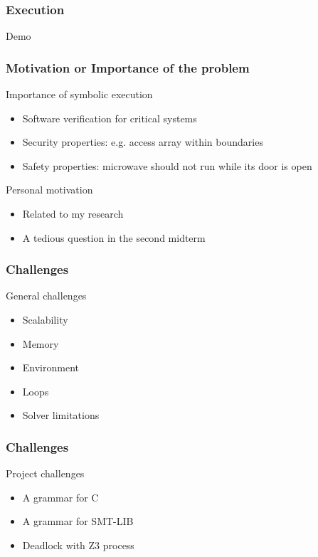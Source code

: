 \documentclass{beamer}
\begin{document}
\begin{frame}[fragile]
\frametitle{Execution}
\huge
\centering

Demo

\end{frame}

\begin{frame}[fragile]
\frametitle{Motivation or Importance of the problem}
\begin{block}{Importance of symbolic execution}
\begin{itemize}
\item Software verification for critical systems
\item Security properties: e.g. access array within boundaries
\item Safety properties: microwave should not run while its door is open
\end{itemize}
\end{block}

\begin{block}{Personal motivation}
\begin{itemize}
\item Related to my research 
\item A tedious question in the second midterm
\end{itemize}
\end{block}

\end{frame}

\begin{frame}[fragile]
\frametitle{Challenges}
\begin{block}{General challenges}
\begin{itemize}
\item Scalability
\item Memory
\item Environment
\item Loops
\item Solver limitations
\end{itemize}
\end{block}
\end{frame}

\begin{frame}[fragile]
\frametitle{Challenges}
\begin{block}{Project challenges}
\begin{itemize}
\item A grammar for C
\item A grammar for SMT-LIB
\item Deadlock with Z3 process

\end{itemize}
\end{block}
\end{frame}
\end{document}
